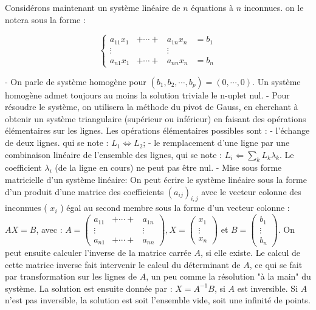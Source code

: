 Considérons maintenant un système linéaire de $n$ équations à $n$ inconnues. on le notera sous la forme :

$$
\left\{\begin{array}{cccc}
a_{11} x_1 & +\cdots+ & a_{1 n} x_n & =b_1 \\
\vdots & & \vdots & \\
a_{n 1} x_1 & +\cdots+ & a_{n n} x_n & =b_n
\end{array}\right.
$$

- On parle de système homogène pour $\left(b_1, b_2, \cdots, b_p\right)=(0, \cdots, 0)$. Un système homogène admet toujours au moins la solution triviale le n-uplet nul.
- Pour résoudre le système, on utilisera la méthode du pivot de Gauss, en cherchant à obtenir un système triangulaire (supérieur ou inférieur) en faisant des opérations élémentaires sur les lignes. Les opérations élémentaires possibles sont :
- l'échange de deux lignes. qui se note : $L_1 \Leftrightarrow L_2$;
- le remplacement d'une ligne par une combinaison linéaire de l'ensemble des lignes, qui se note : $L_i \Leftarrow \sum_k L_k \lambda_k$. Le coefficient $\lambda_i$ (de la ligne en cours) ne peut pas être nul.
- Mise sous forme matricielle d'un système linéaire: On peut écrire le système linéaire sous la forme d'un produit d'une matrice des coefficients $\left(a_{i j}\right)_{i, j}$ avec le vecteur colonne des inconnues ( $x_i$ ) égal au second membre sous la forme d'un vecteur colonne : $A X=B$, avec : $A=\left(\begin{array}{ccc}a_{11} & +\cdots+ & a_{1 n} \\ \vdots & & \vdots \\ a_{n 1} & +\cdots+ & a_{n n}\end{array}\right), X=\left(\begin{array}{c}x_1 \\ \vdots \\ x_n\end{array}\right)$ et $B=\left(\begin{array}{c}b_1 \\ \vdots \\ b_n\end{array}\right)$.
On peut ensuite calculer l'inverse de la matrice carrée $A$, si elle existe. Le calcul de cette matrice inverse fait intervenir le calcul du déterminant de $A$, ce qui se fait par transformation sur les lignes de $A$, un peu comme la résolution "à la main" du système. La solution est ensuite donnée par : $X=A^{-1} B$, si $A$ est inversible. Si $A$ n'est pas inversible, la solution est soit l'ensemble vide, soit une infinité de points.